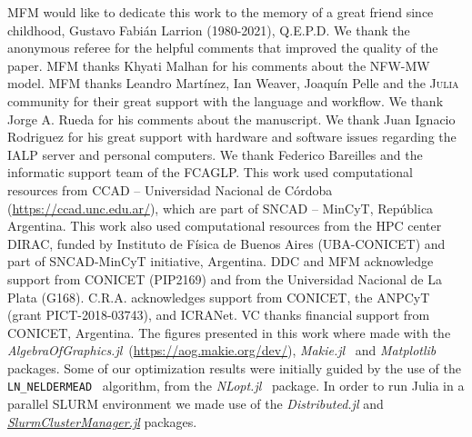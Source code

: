 \documentclass[twocolumn]{aa}
\begin{document}
\begin{acknowledgements}
    MFM would like to dedicate this work to the memory of a great friend since childhood, Gustavo Fabián Larrion (1980-2021), Q.E.P.D.
    We thank the anonymous referee for the helpful comments that improved the quality of the paper.
    MFM thanks Khyati Malhan for his comments about the NFW-MW model.
    MFM thanks Leandro Martínez, Ian Weaver, Joaquín Pelle and the \textsc{Julia} community for their
    great support with the language and workflow. We thank Jorge A. Rueda for his comments
    about the manuscript.
    We thank Juan Ignacio Rodriguez for his great support with hardware and
    software issues regarding the IALP server and personal computers. We thank
    Federico Bareilles and the informatic support team of the FCAGLP.
    This work used computational resources from CCAD – Universidad
    Nacional de Córdoba (\href{https://ccad.unc.edu.ar/}{https://ccad.unc.edu.ar/}),
    which are part of SNCAD – MinCyT, República Argentina.
    This work also used computational resources from the HPC center DIRAC,
    funded by Instituto de Física de Buenos Aires (UBA-CONICET) and part of SNCAD-MinCyT initiative, Argentina.
    DDC and MFM acknowledge support from CONICET (PIP2169) and from the Universidad Nacional de La Plata (G168). C.R.A. acknowledges support from CONICET, the ANPCyT (grant PICT-2018-03743), and ICRANet. VC thanks financial support from CONICET, Argentina.
    The figures presented in this work where made with the
    {\it AlgebraOfGraphics.jl}~(\href{https://aog.makie.org/dev/}{https://aog.makie.org/dev/}),
    {\it Makie.jl}~\citep{DanischKrumbiegel2021} and {\it Matplotlib}~\citep{Hunter:2007}
    packages. Some of our optimization results were initially guided by the use of the \texttt{LN\_NELDERMEAD}~\citep{NELDERMEAD,10.1093/comjnl/8.1.42,shere} algorithm, from the {\it NLopt.jl}~\citep{NLopt} package.
    In order to run {\sc Julia} in a parallel SLURM environment we made use of the {\it Distributed.jl} and \href{https://github.com/kleinhenz/SlurmClusterManager.jl}{\it SlurmClusterManager.jl} packages.
\end{acknowledgements}

%
%
%
\end{document}
